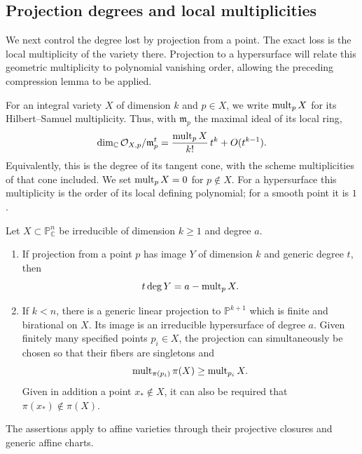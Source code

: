 \subsection{Projection degrees and local multiplicities}

We next control the degree lost by projection from a point.  The exact loss is the local multiplicity of the variety there.  Projection to a hypersurface will relate this geometric multiplicity to polynomial vanishing order, allowing the preceding compression lemma to be applied.

For an integral variety $X$ of dimension $k$ and $p\in X$, we write $\operatorname{mult}_pX$ for its Hilbert--Samuel multiplicity.  Thus, with $\mathfrak{m}_p$ the maximal ideal of its local ring,
\[
 \dim_{\mathbb{C}}\mathcal{O}_{X,p}/\mathfrak{m}_p^t
       =\frac{\operatorname{mult}_pX}{k!}\,t^k+O(t^{k-1}).
\]
Equivalently, this is the degree of its tangent cone, with the scheme multiplicities of that cone included.  We set $\operatorname{mult}_pX=0$ for $p\notin X$.  For a hypersurface this multiplicity is the order of its local defining polynomial; for a smooth point it is $1$.

\begin{lemma}\label{lem:poly-projection}
Let $X\subset\mathbb{P}^n_{\mathbb{C}}$ be irreducible of dimension $k\ge1$ and degree $a$.
\begin{enumerate}[label=(\roman*)]
\item If projection from a point $p$ has image $Y$ of dimension $k$
and generic degree $t$, then
\begin{equation}\label{eq:poly-point-projection-formula}
 t\deg Y=a-\operatorname{mult}_pX.
\end{equation}
\item If $k<n$, there is a generic linear projection to
$\mathbb{P}^{k+1}$ which is finite and birational on $X$.  Its image is an irreducible hypersurface of degree $a$.  Given finitely many specified points $p_i\in X$, the projection can simultaneously be chosen so that their fibers are singletons and
\begin{equation}\label{eq:poly-projection-multiplicity}
 \operatorname{mult}_{\pi(p_i)}\pi(X)\ge\operatorname{mult}_{p_i}X.
\end{equation}
Given in addition a point $x_*\notin X$, it can also be required that $\pi(x_*)\notin\pi(X)$.
\end{enumerate}
The assertions apply to affine varieties through their projective closures and generic affine charts.
\end{lemma}

